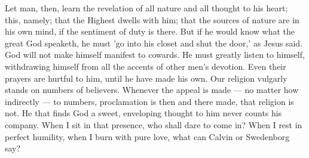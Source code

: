 \documentclass{article}
\begin{document}
Let man, then, learn the revelation of all nature and all thought to his heart; this, namely; that the Highest dwells with him; that the sources of nature are in his own mind, if the sentiment of duty is there. But if he would know what the great God speaketh, he must 'go into his closet and shut the door,' as Jesus said. God will not make himself manifest to cowards. He must greatly listen to himself, withdrawing himself from all the accents of other men's devotion. Even their prayers are hurtful to him, until he have made his own. Our religion vulgarly stands on numbers of believers. Whenever the appeal is made --- no matter how indirectly --- to numbers, proclamation is then and there made, that religion is not. He that finds God a sweet, enveloping thought to him never counts his company. When I sit in that presence, who shall dare to come in? When I rest in perfect humility, when I burn with pure love, what can Calvin or Swedenborg say?
\end{document}
